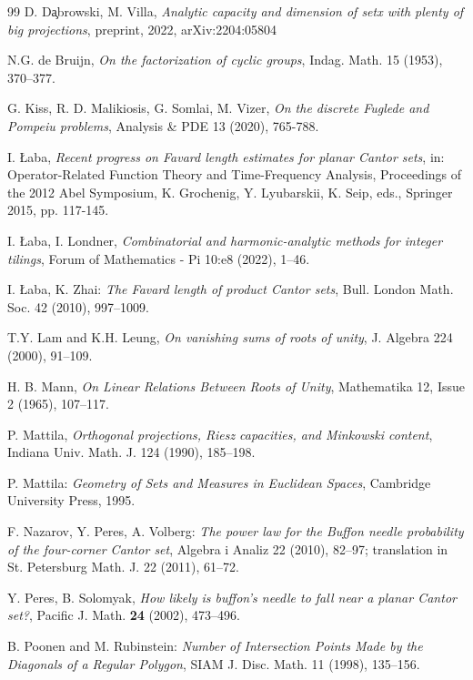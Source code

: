 \begin{thebibliography}{99}
 D. D\c{a}browski, M. Villa, {\it Analytic capacity and dimension of setx with plenty of big projections}, preprint, 2022, arXiv:2204:05804


 N.G. de Bruijn, {\it On the factorization of cyclic groups}, Indag. Math. 15 (1953), 370--377.

%
%


 G. Kiss, R. D. Malikiosis, G. Somlai, M. Vizer, 
{\it On the discrete Fuglede and Pompeiu problems}, Analysis \& PDE 13 (2020), 765-788.

 I. {\L}aba, {\it Recent progress on Favard length estimates for planar Cantor sets}, in: Operator-Related Function Theory and Time-Frequency Analysis, Proceedings of the 2012 Abel Symposium, K. Grochenig, Y. Lyubarskii, K. Seip, eds., Springer 2015, pp. 117-145.


 I. {\L}aba, I. Londner, {\it Combinatorial and harmonic-analytic methods for integer tilings},
Forum of Mathematics - Pi 10:e8 (2022), 1--46.

 I. {\L}aba, K. Zhai: {\it The Favard length of product Cantor sets},
Bull. London Math. Soc. 42 (2010), 997--1009.

%
%
%
%

 T.Y. Lam and K.H. Leung, {\it On vanishing sums of roots of unity},
J. Algebra 224 (2000), 91--109.

 H. B. Mann, {\it On Linear Relations Between Roots of Unity}, Mathematika 12, Issue 2 (1965), 107--117.

 P. Mattila, {\it Orthogonal projections, Riesz capacities, and 
Minkowski content}, Indiana Univ. Math. J. 124 (1990), 185--198.

P. Mattila: {\it Geometry of Sets and Measures in Euclidean Spaces}, Cambridge University Press, 1995.

 F. Nazarov, Y. Peres, A. Volberg: {\em  The power law for the Buffon needle probability of the four-corner Cantor set}, 
Algebra i Analiz 22 (2010), 82--97; translation in St. Petersburg Math. J. 22 (2011),  61--72.

 Y. Peres, B. Solomyak, {\it How likely is buffon's needle to fall near a
planar Cantor set?}, Pacific J. Math. {\bf 24} (2002), 473--496.

B. Poonen and M. Rubinstein: {\it Number of Intersection Points Made by the Diagonals of a Regular Polygon}, SIAM J. Disc. Math. 11 (1998), 135--156.


\end{thebibliography}
